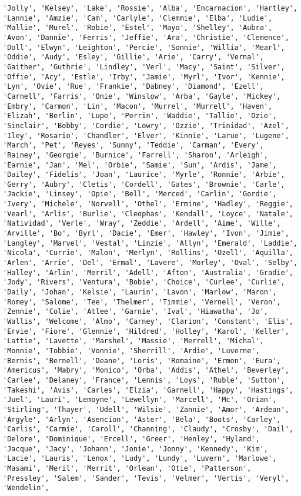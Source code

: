\documentclass[11pt]{article}
\begin{document}
\begin{Verbatim}[commandchars=\\\{\}]
'Jolly', 'Kelsey', 'Lake', 'Rossie', 'Alba', 'Encarnacion', 'Hartley', 'Lannie', 'Amzie', 'Cam', 'Carlyle', 'Clemmie', 'Elba', 'Ludie', 'Mallie', 'Murel', 'Robie', 'Estel', 'Mayo', 'Shelley', 'Aubra', 'Avon', 'Dannie', 'Ferris', 'Jeffie', 'Ara', 'Christie', 'Clemence', 'Doll', 'Elwyn', 'Leighton', 'Percie', 'Sonnie', 'Willia', 'Mearl', 'Oddie', 'Audy', 'Esley', 'Gillie', 'Arie', 'Carry', 'Vernal', 'Gaither', 'Guthrie', 'Lindley', 'Verl', 'Macy', 'Saint', 'Silver', 'Offie', 'Acy', 'Estle', 'Irby', 'Jamie', 'Myrl', 'Ivor', 'Kennie', 'Lyn', 'Ovie', 'Rue', 'Frankie', 'Dabney', 'Diamond', 'Ezell', 'Carnell', 'Farris', 'Onie', 'Winslow', 'Arba', 'Gayle', 'Mickey', 'Embry', 'Carmon', 'Lin', 'Macon', 'Murrel', 'Murrell', 'Haven', 'Elizah', 'Berlin', 'Lupe', 'Perrin', 'Waddie', 'Tallie', 'Ozie', 'Sinclair', 'Bobby', 'Cordie', 'Lowry', 'Ozzie', 'Trinidad', 'Azel', 'Iley', 'Rosario', 'Chandler', 'Elver', 'Kinnie', 'Larue', 'Lugene', 'March', 'Pet', 'Reyes', 'Sunny', 'Teddie', 'Carman', 'Every', 'Rainey', 'Georgie', 'Burnice', 'Farrell', 'Sharon', 'Arleigh', 'Earnie', 'Jan', 'Mel', 'Orbie', 'Samie', 'Sun', 'Ardis', 'Jame', 'Dailey', 'Fidelis', 'Joan', 'Laurice', 'Myrle', 'Ronnie', 'Arbie', 'Gerry', 'Aubry', 'Cletis', 'Cordell', 'Gates', 'Brownie', 'Carle', 'Jackie', 'Linsey', 'Opie', 'Bell', 'Merced', 'Carlin', 'Gordie', 'Ivery', 'Michele', 'Norvell', 'Othel', 'Ermine', 'Hadley', 'Reggie', 'Vearl', 'Arlis', 'Burlie', 'Cleophas', 'Kendall', 'Loyce', 'Natale', 'Natividad', 'Verle', 'Wray', 'Zeddie', 'Ardell', 'Aime', 'Wille', 'Arville', 'Bo', 'Byrl', 'Dacie', 'Emer', 'Hawley', 'Ivon', 'Jimie', 'Langley', 'Marvel', 'Vestal', 'Linzie', 'Allyn', 'Emerald', 'Laddie', 'Nicola', 'Currie', 'Malon', 'Merlyn', 'Rollins', 'Ozell', 'Aquilla', 'Arlen', 'Arrie', 'Del', 'Ermal', 'Lavere', 'Morley', 'Oval', 'Selby', 'Halley', 'Arlin', 'Merril', 'Adell', 'Afton', 'Australia', 'Gradie', 'Jody', 'Rivers', 'Ventura', 'Bobie', 'Choice', 'Curlee', 'Curlie', 'Daily', 'Johan', 'Kelsie', 'Laurin', 'Lavon', 'Marlow', 'Maron', 'Romey', 'Salome', 'Tee', 'Thelmer', 'Timmie', 'Vernell', 'Veron', 'Zennie', 'Colie', 'Atlee', 'Garnie', 'Ival', 'Hiawatha', 'Jo', 'Wallis', 'Welcome', 'Almo', 'Carney', 'Clarion', 'Constant', 'Elis', 'Ervie', 'Fiore', 'Glennie', 'Hildred', 'Holley', 'Karol', 'Keller', 'Lattie', 'Lavette', 'Marshel', 'Massie', 'Merrell', 'Michal', 'Monnie', 'Tobbie', 'Vonnie', 'Sherrill', 'Ardie', 'Luverne', 'Bernis', 'Bernell', 'Deane', 'Loris', 'Romaine', 'Ermon', 'Eura', 'Americus', 'Mabry', 'Monico', 'Orba', 'Addis', 'Athel', 'Beverley', 'Carlee', 'Delaney', 'France', 'Lennis', 'Loys', 'Ruble', 'Sutton', 'Takeshi', 'Avis', 'Carles', 'Elzia', 'Garnell', 'Happy', 'Hastings', 'Juel', 'Lauri', 'Lemoyne', 'Lewellyn', 'Marcell', 'Mc', 'Orian', 'Stirling', 'Thayer', 'Udell', 'Wilsie', 'Zannie', 'Amor', 'Ardean', 'Argyle', 'Arlyn', 'Asencion', 'Aster', 'Bela', 'Boots', 'Carley', 'Carlis', 'Carmie', 'Caroll', 'Channing', 'Claudy', 'Crosby', 'Dail', 'Delore', 'Dominique', 'Ercell', 'Greer', 'Henley', 'Hyland', 'Jacque', 'Jacy', 'Johann', 'Jonie', 'Jonny', 'Kennedy', 'Kim', 'Lacie', 'Lauris', 'Lenox', 'Ludy', 'Lundy', 'Luvern', 'Marlowe', 'Masami', 'Meril', 'Merrit', 'Orlean', 'Otie', 'Patterson', 'Pressley', 'Salem', 'Sander', 'Tevis', 'Velmer', 'Vertis', 'Veryl', 'Wendelin', 
\end{Verbatim}
\end{document}

